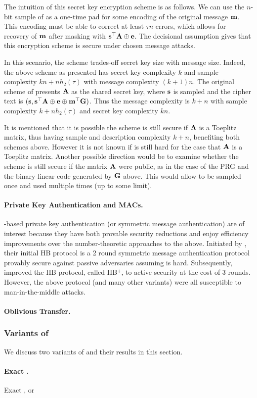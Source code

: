 The intuition of this secret key encryption scheme is as follows.
We can use the $n$-bit sample of \LPN as a one-time pad for some encoding of the original message ${\mathbf m}$.
This encoding must be able to correct at least $\tau n $ errors, which allows for recovery of ${\mathbf m}$ after masking with ${\mathbf s}^\top {\mathbf A} \oplus {\mathbf e}$.
The decisional \LPN assumption gives that this encryption scheme is secure under chosen message attacks.

In this scenario, the scheme trades-off secret key size with message size.
Indeed, the above scheme as presented has secret key complexity $k$ and sample complexity $kn + nh_2(\tau)$ with message complexity $(k+1)n$.
The original scheme of \cite{ICALP:GilRobSeu08} presents ${\mathbf A}$ as the shared secret key, where ${\mathbf s}$ is sampled and the cipher text is $({\mathbf s}, {\mathbf s}^\top {\mathbf A} \oplus {\mathbf e} \oplus {\mathbf m}^\top{\mathbf G})$.
Thus the message complexity is $k + n$ with sample complexity $k + nh_2(\tau)$ and secret key complexity $kn$.

It is mentioned that it is possible the scheme is still secure if ${\mathbf A}$ is a Toeplitz matrix, thus having sample and description complexity $k+n$, benefiting both schemes above.
However it is not known if \LPN is still hard for the case that ${\mathbf A}$ is a Toeplitz matrix.
Another possible direction would be to examine whether the scheme is still secure if the matrix ${\mathbf A}$ were public, as in the case of the \LPN PRG and the binary linear code generated by ${\mathbf G}$ above.
This would allow \bA to be sampled once and used multiple times (up to some limit).

\paragraph{Private Key Authentication and MACs.} \LPN-based private key authentication (or symmetric message authentication) are of interest because they have both provable security reductions and enjoy efficiency improvements over the number-theoretic approaches to the above.
Initiated by \cite{AC:HopBlu01}, their initial HB protocol is a 2 round symmetric message authentication protocol provably secure against passive adversaries assuming \LPN is hard.
Subsequently, \cite{C:JueWei05} improved the HB protocol, called HB$^+$, to active security at the cost of 3 rounds. 
However, the above protocol (and many other variants) were all susceptible to man-in-the-middle attacks.

\paragraph{Oblivious Transfer.} \cite{EPRINT:DGMN08a}





\subsubsection{Variants of \LPN}
We discuss two variants of \LPN and their results in this section.

\paragraph{Exact \LPN.} Exact \LPN, or \XLPN










